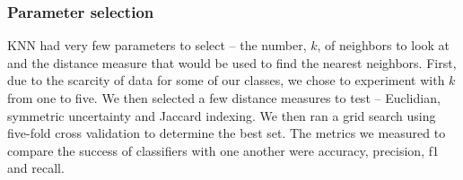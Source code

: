\documentclass[]{report}   %
\begin{document}
\subsubsection{Parameter selection}
KNN had very few parameters to select – the number, $k$, of neighbors to look at and the distance measure that would be used to find the nearest neighbors. First, due to the scarcity of data for some of our classes, we chose to experiment with $k$ from one to five. We then selected a few distance measures to test – Euclidian, symmetric uncertainty and Jaccard indexing. We then ran a grid search using five-fold cross validation to determine the best set. The metrics we measured to compare the success of classifiers with one another were accuracy, precision, f1 and recall. 
\begin{tabular}{l | l | l | l }

\end{tabular}



\begin{thebibliography}{9}
\end{thebibliography}
\end{document}
